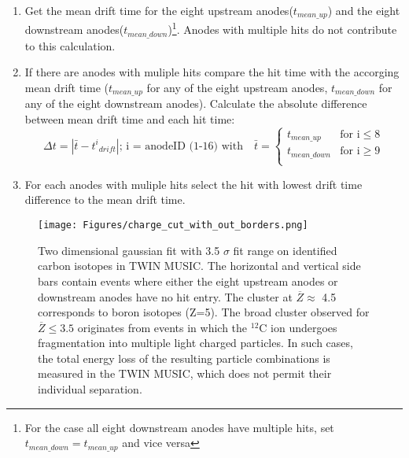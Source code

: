 \begin{enumerate}
\itemsep0em
\item Get the mean drift time for the eight upstream anodes($t_{mean\_up}$) and the eight downstream anodes($t_{mean\_down}$)\footnote{For the case all eight downstream anodes have multiple hits, set $t_{mean\_down} = t_{mean\_up}$ and vice versa}. Anodes with multiple hits do not contribute to this calculation.
\item If there are anodes with muliple hits compare the hit time with the accorging mean drift time ($t_{mean\_up}$ for any of the eight upstream anodes, $t_{mean\_down}$ for any of the eight downstream anodes). Calculate the absolute difference between mean drift time and each hit time:
\begin{equation}
\Delta t = | \bar{t} - {t^i}_{drift}|; \, \text{i = anodeID (1-16) with} \quad \bar{t} = 
\begin{cases}
t_{mean\_up} & \text{for i} \leq 8\\
t_{mean\_down} & \text{for i} \geq 9 \\
\end{cases}
\end{equation}
\item For each anodes with muliple hits select the hit with lowest drift time difference to the mean drift time.
\end{enumerate}
\begin{figure}[htpb]
    \centering
    \texttt{[image: Figures/charge\_cut\_with\_out\_borders.png]}
    \caption{
    Two dimensional gaussian fit with 3.5 $\sigma$ fit range on identified carbon isotopes in TWIN MUSIC. The horizontal and vertical side bars contain events where either the eight upstream anodes or downstream anodes have no hit entry. The cluster at $\overline{Z} \approx$ 4.5 corresponds to boron isotopes (Z=5). The broad cluster observed for $\overline{Z} \leq 3.5$ originates from events in which the $^{12}$C ion undergoes fragmentation into multiple light charged particles. In such cases, the total energy loss of the resulting particle combinations is measured in the TWIN MUSIC, which does not permit their individual separation. 
    }
    \label{fig:twin_2d_gaus_cut}
\end{figure}

